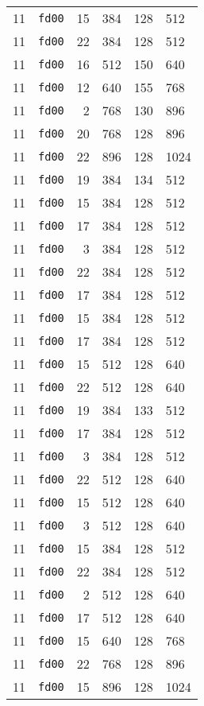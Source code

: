 \documentclass{article}
\begin{document}
\begin{table}[h!]
\begin{tabular}{llrrrl}
    11 & \texttt{fd00} & 15 & 384 & 128 & 512 \\
    11 & \texttt{fd00} & 22 & 384 & 128 & 512 \\
    11 & \texttt{fd00} & 16 & 512 & 150 & 640 \\
    11 & \texttt{fd00} & 12 & 640 & 155 & 768 \\
    11 & \texttt{fd00} & 2 & 768 & 130 & 896 \\
    11 & \texttt{fd00} & 20 & 768 & 128 & 896 \\
    11 & \texttt{fd00} & 22 & 896 & 128 & 1024 \\
    11 & \texttt{fd00} & 19 & 384 & 134 & 512 \\
    11 & \texttt{fd00} & 15 & 384 & 128 & 512 \\
    11 & \texttt{fd00} & 17 & 384 & 128 & 512 \\
    11 & \texttt{fd00} & 3 & 384 & 128 & 512 \\
    11 & \texttt{fd00} & 22 & 384 & 128 & 512 \\
    11 & \texttt{fd00} & 17 & 384 & 128 & 512 \\
    11 & \texttt{fd00} & 15 & 384 & 128 & 512 \\
    11 & \texttt{fd00} & 17 & 384 & 128 & 512 \\
    11 & \texttt{fd00} & 15 & 512 & 128 & 640 \\
    11 & \texttt{fd00} & 22 & 512 & 128 & 640 \\
    11 & \texttt{fd00} & 19 & 384 & 133 & 512 \\
    11 & \texttt{fd00} & 17 & 384 & 128 & 512 \\
    11 & \texttt{fd00} & 3 & 384 & 128 & 512 \\
    11 & \texttt{fd00} & 22 & 512 & 128 & 640 \\
    11 & \texttt{fd00} & 15 & 512 & 128 & 640 \\
    11 & \texttt{fd00} & 3 & 512 & 128 & 640 \\
    11 & \texttt{fd00} & 15 & 384 & 128 & 512 \\
    11 & \texttt{fd00} & 22 & 384 & 128 & 512 \\
    11 & \texttt{fd00} & 2 & 512 & 128 & 640 \\
    11 & \texttt{fd00} & 17 & 512 & 128 & 640 \\
    11 & \texttt{fd00} & 15 & 640 & 128 & 768 \\
    11 & \texttt{fd00} & 22 & 768 & 128 & 896 \\
    11 & \texttt{fd00} & 15 & 896 & 128 & 1024 \\

\end{tabular}
\end{table}
\end{document}
